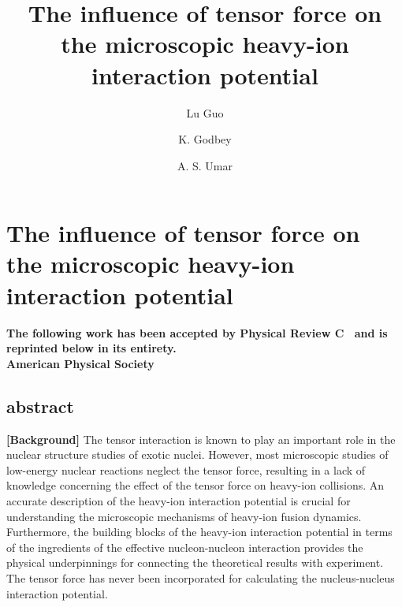 
\chapter{The influence of tensor force on the microscopic heavy-ion interaction potential}\label{chapters:chapter_4}

\title{The influence of tensor force on the microscopic heavy-ion interaction potential}

\author[1,2]{Lu Guo}
\author[3]{K. Godbey}
\author[3]{A. S. Umar}


{
	\bfseries\centering
	The following work has been accepted by Physical Review C~\citep{guo2018b} and is reprinted below in its entirety.\\
	 American Physical Society
	\makeatletter
	\begin{center}\large\bfseries
		\@title
		\par\end{center}
	\begin{center}
		\AB@authlist
		\AB@affillist
	\end{center}
	\makeatother
}
\makeatletter
\renewcommand{\AB@affillist}{}
\renewcommand{\AB@authlist}{}
\setcounter{authors}{0}
\makeatother

\section*{abstract}

		{\bf [Background]}
		The tensor interaction is known to play an important role in the nuclear structure studies of exotic nuclei.
		However, most microscopic studies of low-energy nuclear reactions
		neglect the tensor force, resulting in a lack of knowledge concerning the effect of the tensor force on heavy-ion collisions.
		An accurate description of the heavy-ion interaction
		potential is crucial for understanding the microscopic mechanisms of heavy-ion fusion dynamics.
		Furthermore, the building blocks of the heavy-ion interaction potential in terms of the ingredients of the
		effective nucleon-nucleon interaction provides the physical underpinnings for connecting the theoretical
		results with experiment.
		The tensor force has never been
		incorporated for calculating the nucleus-nucleus interaction potential.
		
